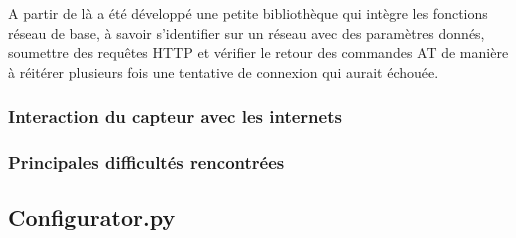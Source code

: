 		\par
		A partir de là a été développé une petite bibliothèque qui intègre les fonctions réseau de base,
		à savoir s'identifier sur un réseau avec des paramètres donnés, soumettre des requêtes HTTP et
		vérifier le retour des commandes AT de manière à réitérer plusieurs fois une tentative de connexion
		qui aurait échouée.
		
		\subsubsection{Interaction du capteur avec les internets}
		
		\subsubsection{Principales difficultés rencontrées}
		
	\subsection{Configurator.py}
